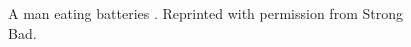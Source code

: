  \begin{figure}[h]
 \centering
{}
\hspace{0.5 in}


 \caption[Eating Batteries]%
  {\label{fig:battery} A man eating batteries \cite{English}.  
  Reprinted with permission from Strong Bad.}
 \vspace{0.5 in}
 \end{figure}

